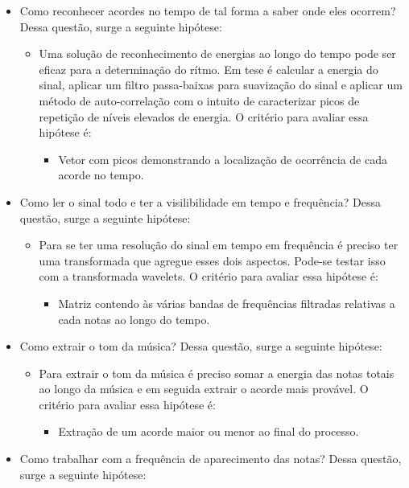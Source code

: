 \begin{itemize}
	\item Como reconhecer acordes no tempo de tal forma a saber onde eles ocorrem? Dessa questão, surge a seguinte hipótese:
	\begin{itemize}
		\item Uma solução de reconhecimento de energias ao longo do tempo pode ser
eficaz para a determinação do rítmo. Em tese é calcular a energia do sinal, aplicar
um filtro passa-baixas para suavização do sinal e aplicar um método de auto-correlação com o intuito de caracterizar picos de repetição de níveis elevados de energia.
		O critério para avaliar essa hipótese é:
			\begin{itemize}
				\item Vetor com picos demonstrando a localização de ocorrência de cada acorde no tempo.		
			\end{itemize}
	\end{itemize}
	\item Como ler o sinal todo e ter a visilibilidade em tempo e frequência? Dessa questão, surge a seguinte hipótese:
	\begin{itemize}
		\item Para se ter uma resolução do sinal em tempo em frequência é
preciso ter uma transformada que agregue esses dois aspectos. Pode-se testar isso
com a transformada wavelets.
		O critério para avaliar essa hipótese é:
			\begin{itemize}
				\item Matriz contendo às várias bandas de frequências filtradas relativas a cada notas ao longo do tempo.
			\end{itemize}
	\end{itemize}
	\item Como extrair o tom da música? Dessa questão, surge a seguinte hipótese:
	\begin{itemize}
		\item Para extrair o tom da música é preciso somar a energia das notas totais
ao longo da música e em seguida extrair o acorde mais provável.
		O critério para avaliar essa hipótese é:
			\begin{itemize}
				\item Extração de um acorde maior ou menor ao final do processo.		
			\end{itemize}
	\end{itemize}
	\item Como trabalhar com a frequência de aparecimento das notas? Dessa questão, surge a seguinte hipótese:
	\begin{itemize}

\end{itemize}
\end{itemize}
